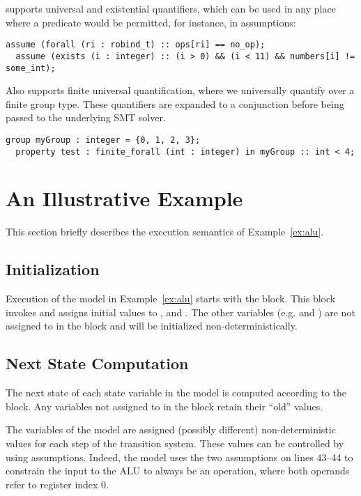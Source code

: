 \uclid{} supports universal and existential quantifiers, which can be used in any place where a predicate would be permitted, for instance, in assumptions:
\begin{lstlisting}[language=uclid,style=uclidstyle]
  assume (forall (ri : robind_t) :: ops[ri] == no_op);
  assume (exists (i : integer) :: (i > 0) && (i < 11) && numbers[i] != some_int);
\end{lstlisting}
\uclid{} Also supports finite universal quantification, where we universally quantify over a finite group type. These quantifiers are expanded to a conjunction before being passed to the underlying SMT solver.
\begin{lstlisting}[language=uclid,style=uclidstyle]
  group myGroup : integer = {0, 1, 2, 3};
  property test : finite_forall (int : integer) in myGroup :: int < 4;
\end{lstlisting}


\section{An Illustrative Example}

This section briefly describes the execution semantics of Example~\ref{ex:alu}.

\subsection{Initialization}
Execution of the model in Example~\ref{ex:alu} starts with the  block. This block invokes  and assigns initial values to ,  and . The other variables (e.g.  and ) are not assigned to in the  block and will be initialized non-deterministically.

\subsection{Next State Computation}
The next state of each state variable in the model is computed according to the  block. Any variables not assigned to in the  block retain their ``old'' values.

The  variables of the model are assigned (possibly different) non-deterministic values for each step of the transition system. These values can be controlled by using assumptions. Indeed, the model uses the two assumptions on lines 43--44 to constrain the input to the ALU to always be an  operation, where both operands refer to register index 0.


